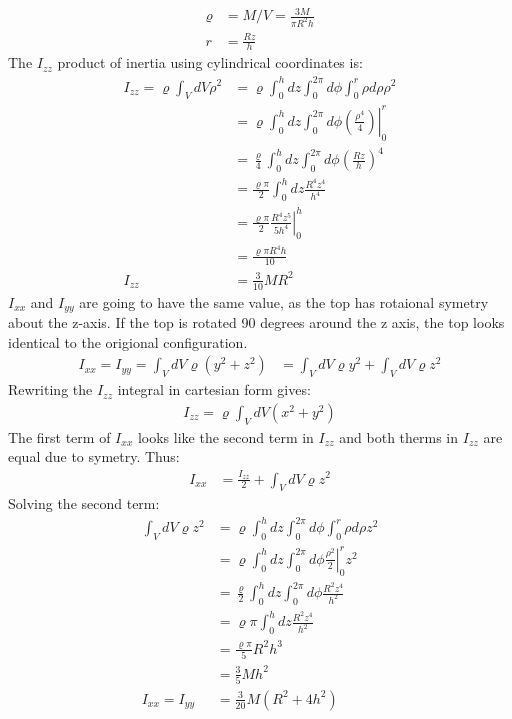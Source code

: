 \documentclass[a4paper,12pt]{article}
\begin{document}
\\
\begin{align*}
\varrho&=M/V=\frac{3M}{\pi R^2h}\\
r&=\frac{Rz}{h}
\end{align*}
The $I_{zz}$ product of inertia using cylindrical coordinates is:
\begin{align*}
I_{zz}=\varrho\int_{V}dV\rho^2&=\varrho\int_0^hdz\int_0^{2\pi}d\phi\int_0^r\rho d\rho\rho^2\\
&=\left.\varrho\int_0^hdz\int_0^{2\pi}d\phi\left(\frac{\rho^4}{4}\right)\right|_0^r\\
&=\frac{\varrho}{4}\int_0^hdz\int_0^{2\pi}d\phi\left(\frac{Rz}{h}\right)^4\\
&=\frac{\varrho\pi}{2}\int_0^hdz\frac{R^4z^4}{h^4}\\
&=\frac{\varrho\pi}{2}\left.\frac{R^4z^5}{5h^4}\right|_0^h\\
&=\frac{\varrho\pi R^4h}{10}\\
I_{zz}&=\frac{3}{10}MR^2
\end{align*}
$I_{xx}$ and $I_{yy}$ are going to have the same value, as the top has rotaional symetry about the z-axis.  If the top is rotated 90 degrees around the z axis, the top looks identical to the origional configuration.
\begin{align*}
I_{xx}=I_{yy}=\int_VdV\varrho(y^2+z^2)&=\int_VdV\varrho y^2+\int_VdV\varrho z^2
\end{align*}
Rewriting the $I_{zz}$ integral in cartesian form gives:
\begin{align*}
I_{zz}=\varrho\int_VdV(x^2+y^2)
\end{align*}
The first term of $I_{xx}$ looks like the second term in $I_{zz}$ and both therms in $I_{zz}$ are equal due to symetry.  Thus:
\begin{align*}
I_{xx}&=\frac{I_{zz}}{2}+\int_VdV\varrho z^2
\end{align*}
Solving the second term:
\begin{align*}
\int_VdV\varrho z^2&=\varrho\int_0^hdz\int_0^{2\pi}d\phi\int_0^r\rho d\rho z^2\\
&=\varrho\int_0^hdz\int_0^{2\pi}d\phi\left.\frac{\rho^2}{2}\right|_0^rz^2\\
&=\frac{\varrho}{2}\int_0^hdz\int_0^{2\pi}d\phi\frac{R^2z^4}{h^2}\\
&=\varrho\pi\int_0^hdz\frac{R^2z^4}{h^2}\\
&=\frac{\varrho\pi}{5}R^2h^3\\
&=\frac{3}{5}Mh^2\\
I_{xx}=I_{yy}&=\frac{3}{20}M(R^2+4h^2)
\end{align*}
\end{document}
